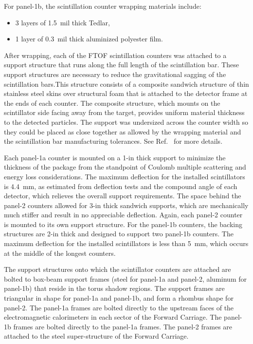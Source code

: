 \documentclass[3p,times,twocolumn]{elsarticle}
\begin{document}
\noindent
For panel-1b, the scintillation counter wrapping materials include:

\begin{itemize}
\item 3 layers of 1.5~mil thick Tedlar,
\item 1 layer of 0.3~mil thick aluminized polyester film.
\end{itemize}

After wrapping, each of the FTOF scintillation counters was attached to a support structure that runs
along the full length of the scintillation bar. These support structures are necessary to reduce the
gravitational sagging of the scintillation bars.This structure consists of a composite sandwich structure
of thin stainless steel skins over structural foam that is attached to the detector frame at the ends of
each counter. The composite structure, which mounts on the scintillator side facing away from the target,
provides uniform material thickness to the detected particles.  The support was undersized across the
counter width so they could be placed as close together as allowed by the wrapping material and the
scintillation bar manufacturing tolerances. See Ref.~\cite{tof-nim} for more details. 

Each panel-1a counter is mounted on a 1-in thick support to minimize the thickness of the package from
the standpoint of Coulomb multiple scattering and energy loss considerations.  The maximum deflection
for the installed scintillators is 4.4~mm, as estimated from deflection tests and the compound angle of
each detector, which relieves the overall support requirements. The space behind the panel-2 counters
allowed for 3-in thick sandwich supports, which are mechanically much stiffer and result in no appreciable
deflection. Again, each panel-2 counter is mounted to its own support structure. For the panel-1b counters,
the backing structures are 2-in thick and designed to support two panel-1b counters. The maximum
deflection for the installed scintillators is less than 5~mm, which occurs at the middle of the longest
counters.

The support structures onto which the scintillator counters are attached are bolted to box-beam support
frames (steel for panel-1a and panel-2, aluminum for panel-1b) that reside in the torus shadow regions.
The support frames are triangular in shape for panel-1a and panel-1b, and form a rhombus shape for
panel-2. The panel-1a frames are bolted directly to the upstream faces of the electromagnetic
calorimeters in each sector of the Forward Carriage. The panel-1b frames are bolted directly to the
panel-1a frames. The panel-2 frames are attached to the steel super-structure of the Forward Carriage.
\end{document}
